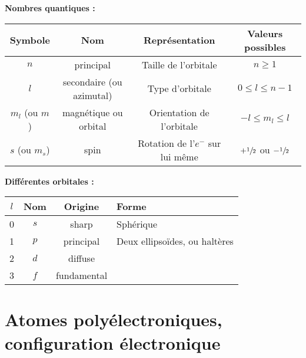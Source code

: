 \documentclass[13pt, twoside, a4paper, french, tikz]{report}
\begin{document}
    \vspace{7pt}
    \textbf{Nombres quantiques :}
    \vspace{7pt}
    
    \begin{tabular}{|c|c|c|c|}
      \hline
      \textbf{Symbole} & \textbf{Nom}             & \textbf{Représentation}          & \textbf{Valeurs possibles}         \\\hline
      $n$              & principal                & Taille de l'orbitale             & $n \ge 1$                          \\\hline
      $l$              & secondaire (ou azimutal) & Type d'orbitale                  & $0 \le l \le n-1$                  \\\hline
      $m_l$ (ou $m$)   & magnétique ou orbital    & Orientation de l'orbitale        & $-l \le m_l \le l$                 \\\hline
      $s$ (ou $m_s$)   & spin                     & Rotation de l'$e^-$ sur lui même & $+\sfrac{1}{2}$ ou $-\sfrac{1}{2}$ \\\hline
    \end{tabular}\label{tab:table}
    
    \vspace{7pt}
    \textbf{Différentes orbitales :}
    \vspace{7pt}
    
    \begin{tabular}{|c|c|c|l|}
      \hline
      \textbf{$l$} & \textbf{Nom} & \textbf{Origine} & \textbf{Forme}                \\\hline
      0            & $s$          & sharp            & Sphérique                     \\\hline
      1            & $p$          & principal        & Deux ellipsoïdes, ou haltères \\\hline
      2            & $d$          & diffuse          &                               \\\hline
      3            & $f$          & fundamental      &                               \\\hline
    \end{tabular}


\chapter{Atomes polyélectroniques,\\configuration électronique}\label{ch:atomes-polyelectroniques---configuration-electronique}
  
\end{document}
